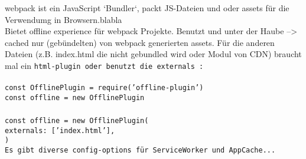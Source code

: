 webpack ist ein JavaScript `Bundler`, packt JS-Dateien und oder assets für die Verwendumg in Browsern.blabla\\
Bietet offline experience für webpack Projekte. Benutzt  und  unter der Haube --> cached nur (gebündelten) von webpack generierten assets. Für die anderen Dateien (z.B. index.html die nicht gebundled wird oder Modul von CDN) braucht mal ein \tt{html-plugin} oder benutzt die \tt{externals} :\\\\
\tt{const OfflinePlugin = require('offline-plugin')\\
  const offline = new OfflinePlugin\\\\
  const offline = new OfflinePlugin({\\
    externals: ['index.html'],\\
    })}\\
Es gibt diverse config-options für ServiceWorker und AppCache...~\cite{webpack-gh}
